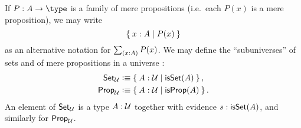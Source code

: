 \documentclass[hott-all.tex]{subfiles}
\begin{document}
%
If $P:A\to \type$ is a family of mere propositions (i.e.\ each $P(x)$ is a mere proposition), we may write
%
\begin{equation}
  \fakelabel{eq:subset}
  \setof{x:A | P(x)}
\end{equation}
%
as an alternative notation for $\sm{x:A} P(x)$.
%
%
%
We may define the ``subuniverses'' of sets and of mere propositions in a universe \UU:
\begin{align*}
  \setU &\defeq \setof{A:\UU | \isset(A) },\\
  \propU &\defeq \setof{A:\UU | \isprop(A) }.
\end{align*}
An element of $\mathsf{Set}_\mathcal{U}$ is a type $A:\mathcal{U}$ together with evidence $s:\mathsf{isSet}(A)$, and similarly for $\mathsf{Prop}_\mathcal{U}$.
%
\end{document}
